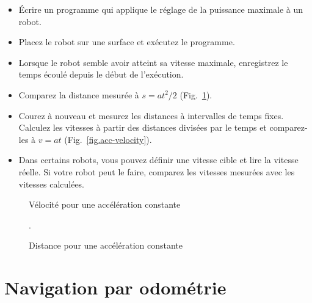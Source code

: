 \begin{framed}
\begin{itemize}
\item Écrire un programme qui applique le réglage de la puissance maximale à un robot.
\item Placez le robot sur une surface et exécutez le programme.
\item Lorsque le robot semble avoir atteint sa vitesse maximale, enregistrez le temps écoulé depuis le début de l'exécution.
\item Comparez la distance mesurée à $s = at^2/2$ (Fig.~\ref{fig.acc-distance}).
\item Courez à nouveau et mesurez les distances à intervalles de temps fixes. Calculez les vitesses à partir des distances divisées par le temps et comparez-les à $v=at$ (Fig.~\ref{fig.acc-velocity}).
\item Dans certains robots, vous pouvez définir une vitesse cible et lire la vitesse réelle. Si votre robot peut le faire, comparez les vitesses mesurées avec les vitesses calculées.
\end{itemize}
\end{framed}

\begin{figure}
\begin{minipage}{.45\textwidth}
\caption{Vélocité pour une accélération constante}\label{fig.acc-velocity}
\end{minipage}
\hspace{\fill}
\begin{minipage}{.45\textwidth}
\caption{Distance pour une accélération constante}\label{fig.acc-distance}.
\end{minipage}
\end{figure}

\section{Navigation par odométrie}\label{s.odometry}

